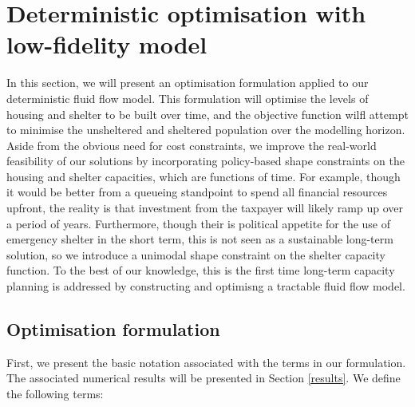 \documentclass[12pt,a4paper]{article}
\begin{document}
\section{Deterministic optimisation with low-fidelity model} \label{do}
%
In this section, we will present an optimisation formulation applied to our deterministic fluid flow model. This formulation will optimise the levels of housing and shelter to be built over time, and the objective function wilfl attempt to minimise the unsheltered and sheltered population over the modelling horizon. Aside from the obvious need for cost constraints, we improve the real-world feasibility of our solutions by incorporating policy-based shape constraints on the housing and shelter capacities, which are functions of time. For example, though it would be better from a queueing standpoint to spend all financial resources upfront, the reality is that investment from the taxpayer will likely ramp up over a period of years. Furthermore, though their is political appetite for the use of emergency shelter in the short term, this is not seen as a sustainable long-term solution, so we introduce a unimodal shape constraint on the shelter capacity function. To the best of our knowledge, this is the first time long-term capacity planning is addressed by constructing and optimisng a tractable fluid flow model. 
%
\subsection{Optimisation formulation} \label{opt}
%
First, we present the basic notation associated with the terms in our formulation. The associated numerical results will be presented in Section \ref{results}. We define the following terms:
\end{document}
